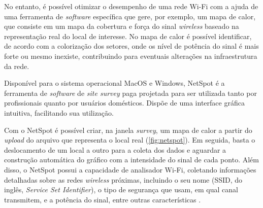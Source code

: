 No entanto, é possível otimizar o desempenho de uma rede Wi-Fi com a ajuda de uma ferramenta de \textit{software} específica que gere, por exemplo, um mapa de calor, que consiste em um mapa da cobertura e força do sinal \textit{wireless} baseado na representação real do local de interesse. No mapa de calor é possível identificar, de acordo com a colorização dos setores, onde os nível de potência do sinal é mais forte ou mesmo inexiste, contribuindo para eventuais alterações na infraestrutura da rede.

\label{subsubsubsec:netspot}

Disponível para o sistema operacional MacOS e Windows, NetSpot é a ferramenta de \textit{software} de \textit{site survey} paga projetada para ser utilizada tanto por profissionais quanto por usuários domésticos. Dispõe de uma interface gráfica intuitiva, facilitando sua utilização.

Com o NetSpot é possível criar, na janela \textit{survey}, um mapa de calor a partir do \textit{upload} do arquivo que representa o local real (\autoref{fig:netspot}). Em seguida, basta o deslocamento de um local a outro para a coleta dos dados e aguardar a construção automática do gráfico com a intensidade do sinal de cada ponto. Além disso, o NetSpot possui a capacidade de analisador Wi-Fi, coletando informações detalhadas sobre as redes \textit{wireless} próximas, incluindo o seu nome (SSID, do inglês, \textit{Service Set Identifier}), o tipo de segurança que usam, em qual canal transmitem, e a potência do sinal, entre outras características \cite{Netspot2019}.

\begin{figure}[H]
	\centering
\end{figure}

